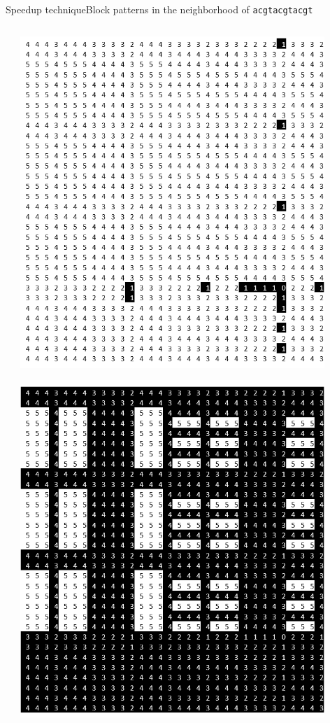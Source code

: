 \documentclass[pdf,xcolor={dvipsnames}]{beamer}
\begin{document}
\begin{frame}{Speedup technique}{Block patterns in the neighborhood of \texttt{acgtacgtacgt}}
\begin{columns}
\begin{column}{0.33\textwidth}
			\end{column}
			\begin{column}{0.33\textwidth}
				\includegraphics[width=0.9\textwidth]{img/1.png}\\\ \\
				\includegraphics[width=0.9\textwidth]{img/4.png}

\end{column}
\end{columns}
\end{frame}
\end{document}

